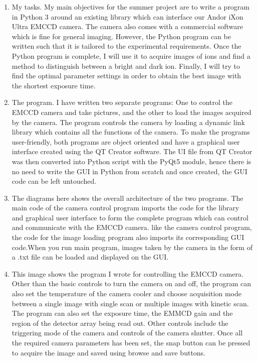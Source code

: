 \documentclass[12pt]{article}
\begin{document}
\begin{enumerate}
\item My tasks. My main objectives for the summer project are to write a program in Python 3 around an existing library which can interface our Andor iXon Ultra EMCCD camera. The camera also comes with a commercial software which is fine for general imaging. However, the Python program can be written such that it is tailored to the experimental requirements. Once the Python program is complete, I will use it to acquire images of ions and find a method to distinguish between a bright and dark ion. Finally, I will try to find the optimal parameter settings in order to obtain the best image with the shortest exposure time.

\item The program. I have written two separate programs: One to control the EMCCD camera and take pictures, and the other to load the images acquired by the camera.  The program controls the camera by loading a dynamic link library which contains all the functions of the camera. To make the programs user-friendly, both programs are object oriented and have a graphical user interface created using the QT Creator software. The UI file from QT Creator was then converted into Python script with the PyQt5 module, hence there is no need to write the GUI in Python from scratch and once created, the GUI code can be left untouched.

\item The diagrams here shows the overall architecture of the two programs. The main code of the camera control program imports the code for the library and graphical user interface to form the complete program which can control and communicate with the EMCCD camera. like the camera control program, the code for the image loading program also imports its corresponding  GUI code.When you run main program, images taken by the camera in the form of a .txt file can be loaded and displayed on the GUI.

\item This image shows the program I wrote for controlling the EMCCD camera. Other than the basic controls to turn the camera on and off, the program can also set the temperature of the camera cooler and choose acquisition mode between a single image with single scan or multiple images with kinetic scan. The program can also set the exposure time, the EMMCD gain and the region of the detector array being read out. Other controls include the triggering mode of the camera and controls of the camera shutter. Once all the required camera parameters has been set, the snap button can be pressed to acquire the image and saved using browse and save buttons.


\end{enumerate}
\end{document}
